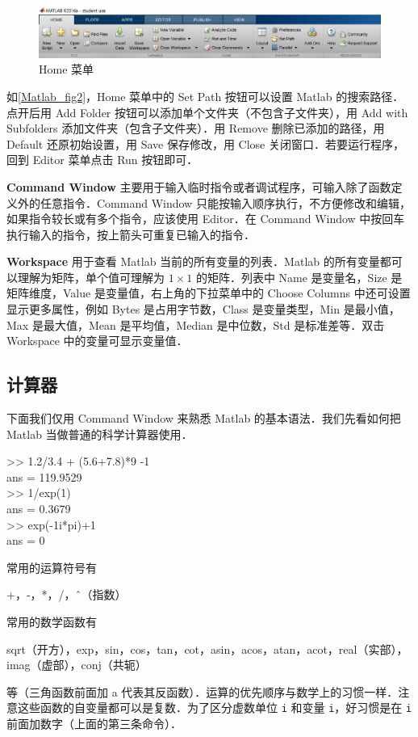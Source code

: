 \begin{figure}[ht]
\centering
\includegraphics[width= 14cm]{./figures/Matlab2.pdf}
\caption{Home 菜单}\label{Matlab_fig2}
\end{figure}

如\autoref{Matlab_fig2}，Home 菜单中的 Set Path 按钮可以设置 Matlab 的搜索路径．点开后用 Add Folder 按钮可以添加单个文件夹（不包含子文件夹），用 Add with Subfolders 添加文件夹（包含子文件夹）．用 Remove 删除已添加的路径，用 Default 还原初始设置，用 Save 保存修改，用 Close 关闭窗口．若要运行程序，回到 Editor 菜单点击 Run 按钮即可．

\textbf{Command Window} 主要用于输入临时指令或者调试程序，可输入除了函数定义外的任意指令．Command Window 只能按输入顺序执行，不方便修改和编辑，如果指令较长或有多个指令，应该使用 Editor．在 Command Window 中按回车执行输入的指令，按上箭头可重复已输入的指令．

\textbf{Workspace} 用于查看 Matlab 当前的所有变量的列表．Matlab 的所有变量都可以理解为矩阵，单个值可理解为 $1\times 1$ 的矩阵．列表中 Name 是变量名，Size 是矩阵维度，Value 是变量值，右上角的下拉菜单中的 Choose Columns 中还可设置显示更多属性，例如 Bytes 是占用字节数，Class 是变量类型，Min 是最小值，Max 是最大值，Mean 是平均值，Median 是中位数，Std 是标准差等．双击 Workspace 中的变量可显示变量值．

\subsection{计算器}
下面我们仅用 Command Window 来熟悉 Matlab 的基本语法．我们先看如何把 Matlab 当做普通的科学计算器使用．
\begin{Command}
>> 1.2/3.4 + (5.6+7.8)*9 -1 \\
ans = 119.9529 \\
>> 1/exp(1) \\
ans = 0.3679 \\
>> exp(-1i*pi)+1 \\
ans = 0
\end{Command}
常用的运算符号有
\begin{Command}
+，-，*，/，\^\ （指数）
\end{Command}
常用的数学函数有
\begin{Command}
sqrt（开方），exp，sin，cos，tan，cot，asin，acos，atan，acot，real（实部），imag（虚部），conj（共轭）
\end{Command}
等（三角函数前面加 a 代表其反函数）．运算的优先顺序与数学上的习惯一样．注意这些函数的自变量都可以是复数．为了区分虚数单位 \texttt{i} 和变量 \texttt{i}，好习惯是在 \texttt{i} 前面加数字（上面的第三条命令）．

